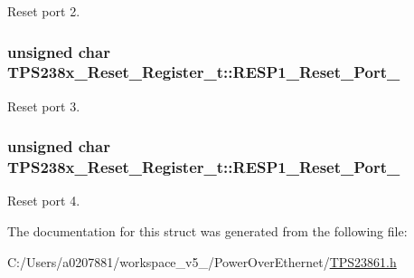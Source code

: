 Reset port 2. 

\hypertarget{struct_t_p_s238x___reset___register__t_a46d253541c9691222b3a5382f9f57442}{
\subsubsection[{R\-E\-S\-P1\-\_\-\-Reset\-\_\-\-Port\-\_\-3}]{\setlength{\rightskip}{0pt plus 5cm}unsigned char T\-P\-S238x\-\_\-\-Reset\-\_\-\-Register\-\_\-t\-::\-R\-E\-S\-P1\-\_\-\-Reset\-\_\-\-Port\-\_}}\label{struct_t_p_s238x___reset___register__t_a46d253541c9691222b3a5382f9f57442}


Reset port 3. 

\hypertarget{struct_t_p_s238x___reset___register__t_ac65e7d88e6728a818a270f4e7d82a269}{
\subsubsection[{R\-E\-S\-P1\-\_\-\-Reset\-\_\-\-Port\-\_\-4}]{\setlength{\rightskip}{0pt plus 5cm}unsigned char T\-P\-S238x\-\_\-\-Reset\-\_\-\-Register\-\_\-t\-::\-R\-E\-S\-P1\-\_\-\-Reset\-\_\-\-Port\-\_}}\label{struct_t_p_s238x___reset___register__t_ac65e7d88e6728a818a270f4e7d82a269}


Reset port 4. 



The documentation for this struct was generated from the following file\-:\begin{DoxyCompactItemize}
\item 
C\-:/\-Users/a0207881/workspace\-\_\-v5\-\_/\-Power\-Over\-Ethernet/\hyperlink{_t_p_s23861_8h}{T\-P\-S23861.\-h}\end{DoxyCompactItemize}
